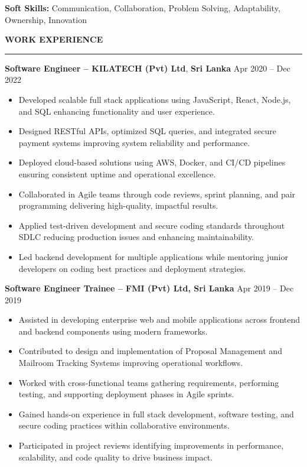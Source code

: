 \documentclass[10pt,letterpaper]{article}
\begin{document}
\textbf{Soft Skills:} Communication, Collaboration, Problem Solving, Adaptability, Ownership, Innovation

\vspace{8pt}

\textbf{WORK EXPERIENCE}\\[-8pt]
\noindent\rule{\textwidth}{1pt}

\vspace{-2pt}

\textbf{Software Engineer -- KILATECH (Pvt) Ltd}, \textbf{Sri Lanka} \hfill Apr 2020 -- Dec 2022

\vspace{-1pt}

\begin{itemize}
\item Developed scalable full stack applications using JavaScript, React, Node.js, and SQL enhancing functionality and user experience.
\item Designed RESTful APIs, optimized SQL queries, and integrated secure payment systems improving system reliability and performance.
\item Deployed cloud-based solutions using AWS, Docker, and CI/CD pipelines ensuring consistent uptime and operational excellence.
\item Collaborated in Agile teams through code reviews, sprint planning, and pair programming delivering high-quality, impactful results.
\item Applied test-driven development and secure coding standards throughout SDLC reducing production issues and enhancing maintainability.
\item Led backend development for multiple applications while mentoring junior developers on coding best practices and deployment strategies.
\end{itemize}

\textbf{Software Engineer Trainee -- FMI (Pvt) Ltd, Sri Lanka} \hfill Apr 2019 -- Dec 2019

\vspace{-1pt}

\begin{itemize}
\item Assisted in developing enterprise web and mobile applications across frontend and backend components using modern frameworks.
\item Contributed to design and implementation of Proposal Management and Mailroom Tracking Systems improving operational workflows.
\item Worked with cross-functional teams gathering requirements, performing testing, and supporting deployment phases in Agile sprints.
\item Gained hands-on experience in full stack development, software testing, and secure coding practices within collaborative environments.
\item Participated in project reviews identifying improvements in performance, scalability, and code quality to drive business impact.
\end{itemize}
\end{document}

